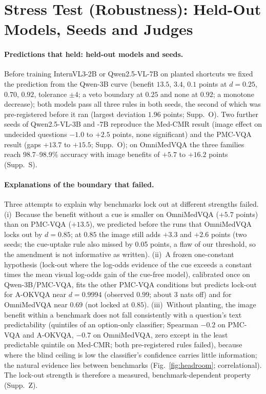 \section{Stress Test (Robustness): Held-Out Models, Seeds and Judges}
\label{sec:general}

\paragraph{Predictions that held: held-out models and seeds.}
Before training InternVL3-2B or Qwen2.5-VL-7B on planted shortcuts we fixed the prediction from the Qwen-3B curve (benefit $13.5$, $3.4$, $0.1$ points at $d=0.25$, $0.70$, $0.92$, tolerance $\pm4$; a veto boundary at $0.25$ and none at $0.92$; a monotone decrease); both models pass all three rules in both seeds, the second of which was pre-registered before it ran (largest deviation $1.96$ points; Supp.~O).
Two further seeds of Qwen2.5-VL-3B and -7B reproduce the Med-CMR result (image effect on undecided questions $-1.0$ to $+2.5$ points, none significant) and the PMC-VQA result (gaps $+13.7$ to $+15.5$; Supp.~O); on OmniMedVQA the three families reach 98.7--98.9\% accuracy with image benefits of $+5.7$ to $+16.2$ points (Supp.~S).

\paragraph{Explanations of the boundary that failed.}
Three attempts to explain why benchmarks lock out at different strengths failed.
(i)~Because the benefit without a cue is smaller on OmniMedVQA ($+5.7$ points) than on PMC-VQA ($+13.5$), we predicted before the runs that OmniMedVQA locks out by $d=0.85$; at $0.85$ the image still adds $+3.3$ and $+2.6$ points (two seeds; the cue-uptake rule also missed by 0.05 points, a flaw of our threshold, so the amendment is not informative as written).
(ii)~A frozen one-constant hypothesis (lock-out where the log-odds evidence of the cue exceeds a constant times the mean visual log-odds gain of the cue-free model), calibrated once on Qwen-3B/PMC-VQA, fits the other PMC-VQA conditions but predicts lock-out for A-OKVQA near $d=0.9994$ (observed $0.99$; about 3 nats off) and for OmniMedVQA near $0.69$ (not locked at $0.85$).
(iii)~Without planting, the image benefit within a benchmark does not fall consistently with a question's text predictability (quintiles of an option-only classifier; Spearman $-0.2$ on PMC-VQA and A-OKVQA, $-0.7$ on OmniMedVQA, zero except in the least predictable quintile on Med-CMR; both pre-registered rules failed), because where the blind ceiling is low the classifier's confidence carries little information; the natural evidence lies between benchmarks (Fig.~\ref{fig:headroom}; correlational).
The lock-out strength is therefore a measured, benchmark-dependent property (Supp.~Z).

